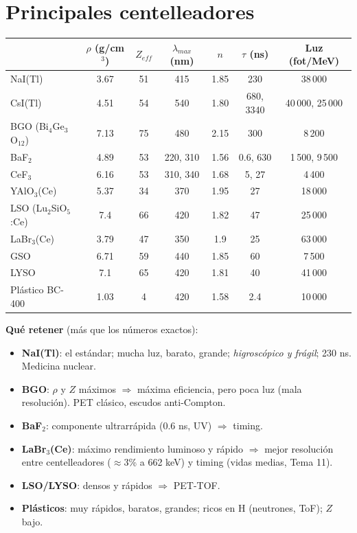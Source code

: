 \section{Principales centelleadores}
\begin{clave}
\begin{center}\small
\begin{tabular}{lcccccc}
\toprule
& $\rho$ (g/cm$^3$) & $Z_{eff}$ & $\lambda_{max}$ (nm) & $n$ & $\tau$ (ns) & Luz (fot/MeV)\\
\midrule
NaI(Tl) & 3.67 & 51 & 415 & 1.85 & 230 & 38\,000\\
CsI(Tl) & 4.51 & 54 & 540 & 1.80 & 680, 3340 & 40\,000, 25\,000\\
BGO (Bi$_4$Ge$_3$O$_{12}$) & 7.13 & 75 & 480 & 2.15 & 300 & 8\,200\\
BaF$_2$ & 4.89 & 53 & 220, 310 & 1.56 & 0.6, 630 & 1\,500, 9\,500\\
CeF$_3$ & 6.16 & 53 & 310, 340 & 1.68 & 5, 27 & 4\,400\\
YAlO$_3$(Ce) & 5.37 & 34 & 370 & 1.95 & 27 & 18\,000\\
LSO (Lu$_2$SiO$_5$:Ce) & 7.4 & 66 & 420 & 1.82 & 47 & 25\,000\\
LaBr$_3$(Ce) & 3.79 & 47 & 350 & 1.9 & 25 & 63\,000\\
GSO & 6.71 & 59 & 440 & 1.85 & 60 & 7\,500\\
LYSO & 7.1 & 65 & 420 & 1.81 & 40 & 41\,000\\
Plástico BC-400 & 1.03 & 4 & 420 & 1.58 & 2.4 & 10\,000\\
\bottomrule
\end{tabular}
\end{center}
\textbf{Qué retener} (más que los números exactos):
\begin{itemize}
\item \textbf{NaI(Tl)}: el estándar; mucha luz, barato, grande; \emph{higroscópico y frágil}; 230 ns. Medicina nuclear.
\item \textbf{BGO}: $\rho$ y $Z$ máximos $\Rightarrow$ máxima eficiencia, pero poca luz (mala resolución). PET clásico, escudos anti-Compton.
\item \textbf{BaF$_2$}: componente ultrarrápida (0.6 ns, UV) $\Rightarrow$ timing.
\item \textbf{LaBr$_3$(Ce)}: máximo rendimiento luminoso y rápido $\Rightarrow$ mejor resolución entre centelleadores ($\approx$3\% a 662 keV) y timing (vidas medias, Tema 11).
\item \textbf{LSO/LYSO}: densos y rápidos $\Rightarrow$ PET-TOF.
\item \textbf{Plásticos}: muy rápidos, baratos, grandes; ricos en H (neutrones, ToF); $Z$ bajo.
\end{itemize}
\end{clave}
